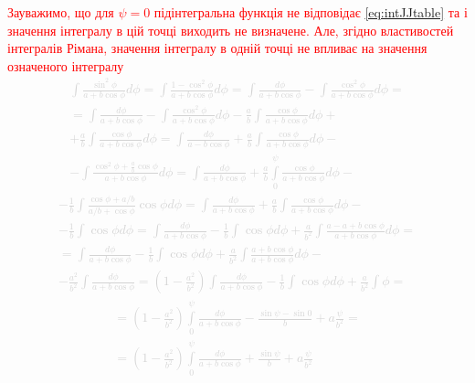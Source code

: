 \textcolor{red} {Зауважимо, що для $ \psi = 0 $ підінтегральна функція не 
відповідає \eqref{eq:intJJtable} та і значення інтегралу в цій точці виходить не 
визначене. Але, згідно властивостей інтегралів Рімана, значення інтегралу в одній 
точці не впливає на значення означеного інтегралу}
%
\textcolor{lightgray}{ \begin{equation*} \begin{aligned}
\int \frac{\sin^2{\phi}}{a + b \cos \phi} d \phi = 
\int \frac{1 - \cos^2{\phi}}{a + b \cos \phi} d \phi = 
\int\frac{d \phi}{a + b \cos \phi}  -
\int \frac{\cos^2{\phi}}{a + b \cos \phi} d \phi = \\
= \int \frac{d \phi}{a + b \cos \phi}  - 
\int \frac{\cos^2{\phi}}{a + b \cos \phi} d \phi -
\frac{a}{b} \int \frac{\cos \phi}{a + b \cos \phi} d \phi + \\
+ \frac{a}{b} \int \frac{\cos \phi}{a + b \cos \phi} d \phi = 
\int \frac{d \phi}{a - b \cos \phi} +
\frac{a}{b} \int \frac{\cos \phi}{a + b \cos \phi} d \phi - \\
- \int \frac{\cos^2{\phi} + \frac{a}{b} \cos \phi} {a + b \cos \phi} d \phi =
\int \frac{d \phi}{a + b \cos \phi} + 
\frac{a}{b} \int\limits_{0}^{\psi} \frac{\cos \phi}{a + b \cos \phi} d \phi -
\end{aligned} \end{equation*} }
%
\textcolor{lightgray}{ \begin{equation*} \begin{aligned}
- \frac{1}{b} \int \frac{\cos \phi + a/b} {a/b +  \cos \phi} \cos \phi d \phi = 
\int \frac{d \phi}{a + b \cos \phi} + 
\frac{a}{b} \int \frac{\cos \phi}{a + b \cos \phi} d \phi - \\
- \frac{1}{b} \int \cos \phi d \phi = \int \frac{d \phi}{a + b \cos \phi} - 
\frac{1}{b} \int \cos \phi d \phi + \frac{a}{b^2} \int
\frac{a - a + b \cos \phi}{a + b \cos \phi} d \phi = \\ 
= \int\frac{d \phi}{a + b \cos \phi} - \frac{1}{b} \int \cos \phi d \phi +
\frac{a}{b^2} \int \frac{a + b \cos \phi}{a + b \cos \phi} d \phi - \\ 
- \frac{a^2}{b^2} \int \frac{d \phi}{a + b \cos \phi} = 
\left( 1 - \frac{a^2}{b^2} \right) \int\frac{d \phi}{a + b \cos \phi} - 
\frac{1}{b} \int \cos \phi d \phi + \frac{a}{b^2} \int \phi =
\end{aligned} \end{equation*} }
%
\textcolor{lightgray}{ \begin{equation*} \begin{aligned}
= \left( 1 - \frac{a^2}{b^2} \right)
\int\limits_{0}^{\psi} \frac{d \phi}{a + b \cos \phi} -
\frac{\sin \psi - \sin 0}{b} + a \frac{\psi}{b^2} = \\
= \left( 1 - \frac{a^2}{b^2} \right)
\int\limits_{0}^{\psi} \frac{d \phi}{a + b \cos \phi} +
\frac{\sin \psi}{b} + a \frac{\psi}{b^2}
\end{aligned} \end{equation*} }
